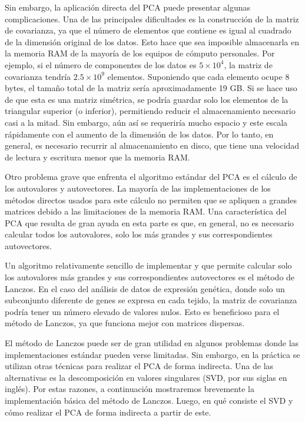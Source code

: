 Sin embargo, la aplicación directa del PCA puede presentar algunas complicaciones. Una de las principales dificultades es la construcción de la matriz de covarianza, ya que el número de elementos que contiene es igual al cuadrado de la dimensión original de los datos. Esto hace que sea imposible almacenarla en la memoria RAM de la mayoría de los equipos de cómputo personales. Por ejemplo, si el número de componentes de los datos es $5 \times 10^4$, la matriz de covarianza tendría $2.5 \times 10^9$ elementos. Suponiendo que cada elemento ocupe 8 bytes, el tamaño total de la matriz sería aproximadamente 19 GB. Si se hace uso de que esta es una matriz simétrica, se podría guardar solo los elementos de la triangular superior (o inferior), permitiendo reducir el almacenamiento necesario casi a la mitad. Sin embargo, aún así se requeriría mucho espacio y este escala rápidamente con el aumento de la dimensión de los datos. Por lo tanto, en general, es necesario recurrir al almacenamiento en disco, que tiene una velocidad de lectura y escritura menor que la memoria RAM.

Otro problema grave que enfrenta el algoritmo estándar del PCA es el cálculo de los autovalores y autovectores. La mayoría de las implementaciones de los métodos directos usados para este cálculo no permiten que se apliquen a grandes matrices debido a las limitaciones de la memoria RAM. Una característica del PCA que resulta de gran ayuda en esta parte es que, en general, no es necesario calcular todos los autovalores, solo los más grandes y sus correspondientes autovectores.

Un algoritmo relativamente sencillo de implementar y que permite calcular solo los autovalores más grandes y  sus correspondientes autovectores es el método de Lanczos. En el caso del análisis de datos de expresión genética, donde solo un subconjunto diferente de genes se expresa en cada tejido, la matriz de covarianza podría tener un número elevado de valores nulos. Esto es beneficioso para el método de Lanczos, ya que funciona mejor con matrices dispersas.

El método de Lanczos puede ser de gran utilidad en algunos problemas donde las implementaciones estándar pueden verse limitadas. Sin embargo, en la práctica se utilizan otras técnicas para realizar el PCA de forma indirecta. Una de las alternativas es la descomposición en valores singulares (SVD, por sus siglas en inglés). Por estas razones, a continuación mostraremos brevemente la implementación básica del método de Lanczos. Luego, en qué consiste el SVD y cómo realizar el PCA de forma indirecta a partir de este.

